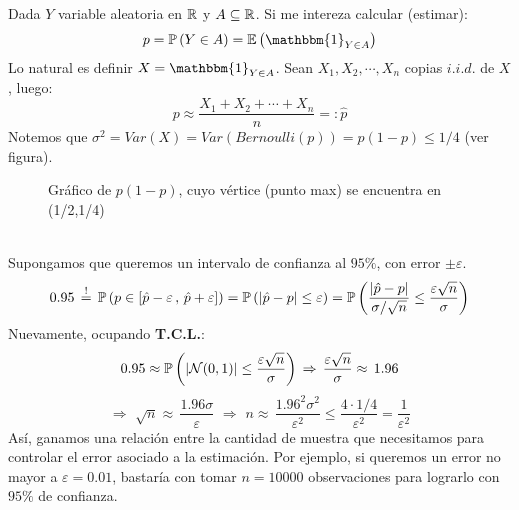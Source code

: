 \begin{ejemplo}
Dada $Y$ variable aleatoria en $\mathbb R$ y $A\subseteq\mathbb R$. Si me intereza calcular (estimar):
\[p = \pb\left(Y\in A\right) = \E\left(\mathbbm{1}_{Y\in A}\right)\]
Lo natural es definir $X=\mathbbm{1}_{Y\in A}$. Sean $X_1,X_2,\cdots,X_n$ copias $i.i.d.$ de $X$, luego:
\[p\approx \frac{X_1+X_2+\cdots+X_n}{n}=:\hat{p}\]
Notemos que $\sigma^2 = Var(X) = Var(Bernoulli(p)) = p(1-p) \leq 1/4$ (ver figura).
\newline 
\begin{figure}[h!]
    \centering
    \caption{Gráfico de $p(1-p)$, cuyo vértice (punto max) se encuentra en (1/2,1/4)}
\end{figure}\\
Supongamos que queremos un intervalo de confianza al $95\%$, con error $\pm\varepsilon$.
\[0.95 \,\overset{!}{=}\,\mathbb{P}\left(p\in[\hat{p}-\varepsilon\,,\,\hat{p}+\varepsilon]\right)= \mathbb{P}\left(|\hat{p}-p|\leq\varepsilon\right) = \mathbb{P}\left(\frac{|\hat{p}-p|}{\sigma/\sqrt{n}} \leq \frac{\varepsilon\sqrt{n}}{\sigma}\right)\]
Nuevamente, ocupando \textbf{T.C.L.}:
\[0.95\approx \mathbb{P}\left(|\mathcal{N}(0,1)|\leq \frac{\varepsilon\sqrt{n}}{\sigma}\right)\,\Rightarrow
\,\frac{\varepsilon\sqrt{n}}{\sigma}\approx\,1.96\]
\[\Rightarrow\,\,\sqrt{n}\approx\,\frac{1.96\sigma}{\varepsilon}\,\,\Rightarrow\,\,n\approx\,\frac{1.96^2\sigma^2}{\varepsilon^2}\leq\frac{4\cdot 1/4}{\varepsilon^2}=\frac{1}{\varepsilon^2}\]
Así, ganamos una relación entre la cantidad de muestra que necesitamos para controlar el error asociado a la estimación. Por ejemplo, si queremos un error no mayor a $\varepsilon = 0.01$, bastaría con tomar $n=10000$ observaciones para lograrlo con $95\%$ de confianza.
\end{ejemplo}


